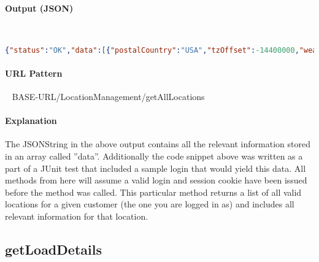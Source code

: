 \documentclass[
10pt, %
letterpaper, %
oneside, %
headinclude,footinclude, %
BCOR5mm, %
]{scrartcl}
\begin{document}
\paragraph{Output (JSON)}~
\begin{lstlisting}[language=json]
{"status":"OK","data":[{"postalCountry":"USA","tzOffset":-14400000,"weatherStationRef":1332878257808,"postalState":"MA","postalZip":"02054","id":750,"customerId":13,"jsonobjectName":"LocationDetails","name":"Millis","acquisitionZone":"DEFAULT","postalCity":"Millis","active":true,"longitude":-71.354,"postalStreet1":"6 Milliston Rd","latitude":42.167,"timeZoneName":"America/New_York","postalStreet3":null,"postalStreet2":null},{"postalCountry":"USA","tzOffset":-14400000,"weatherStationRef":1332878257808,"postalState":"MA","postalZip":null,"id":751,"customerId":13,"jsonobjectName":"LocationDetails","name":"Easton","acquisitionZone":"DEFAULT","postalCity":"Easton","active":true,"longitude":-71.095,"postalStreet1":null,"latitude":42.088,"timeZoneName":"America/New_York","postalStreet3":null,"postalStreet2":null}],"version":1}
\end{lstlisting}


\paragraph{URL Pattern} 
~\newline
BASE-URL/LocationManagement/getAllLocations

\paragraph{Explanation} The JSONString in the above output contains all the relevant information stored in an array called ''data''. Additionally the code snippet above was written as a part of a JUnit test that included a sample login that would yield this data. All methods from here will assume a valid login and session cookie have been issued before the method was called. This particular method returns a list of all valid locations for a given customer (the one you are logged in as) and includes all relevant information for that location. 



\subsection{\textbf{getLoadDetails}}
\end{document}
